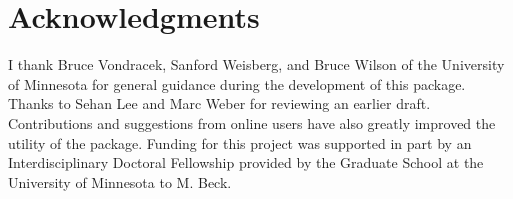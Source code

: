 \documentclass[article,shortnames]{jss}
\begin{document}
\section[Acknowledgments]{Acknowledgments}
 
I thank Bruce Vondracek, Sanford Weisberg, and Bruce Wilson of the University of Minnesota for general guidance during the development of this package.  Thanks to Sehan Lee and Marc Weber for reviewing an earlier draft.  Contributions and suggestions from online users have also greatly improved the utility of the package.  Funding for this project was supported in part by an Interdisciplinary Doctoral Fellowship provided by the Graduate School at the University of Minnesota to M. Beck.  


\end{document}

